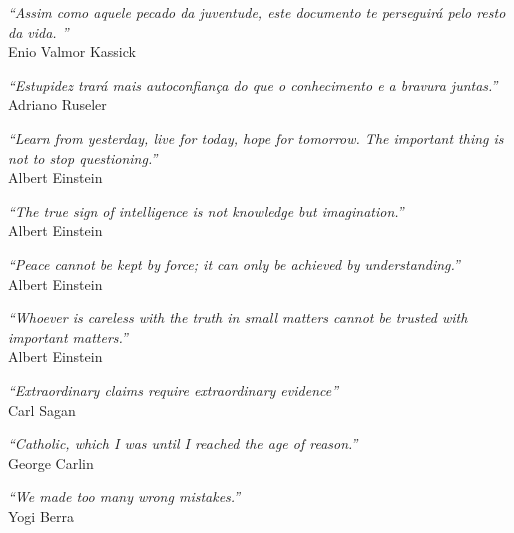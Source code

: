 


\begin{epigrafe}

    \vspace*{\fill}
    \begin{flushright}
        \textit{``Assim como aquele pecado da juventude, este documento te perseguirá pelo resto da vida. \showfont''}\\Enio Valmor Kassick
    \end{flushright}
    \begin{flushright}
        \textit{``Estupidez trará mais autoconfiança do que o conhecimento e a bravura juntas.''}\\
        Adriano Ruseler
    \end{flushright}
    \begin{flushright}
        \textit{``Learn from yesterday, live for today, hope for tomorrow. The important thing is not to stop questioning.''}\\ Albert Einstein
    \end{flushright}
    \begin{flushright}
        \textit{``The true sign of intelligence is not knowledge but imagination.''}\\  Albert Einstein
    \end{flushright}
    \begin{flushright}
        \textit{``Peace cannot be kept by force; it can only be achieved by understanding.''}\\ Albert Einstein
    \end{flushright}
    \begin{flushright}
        \textit{``Whoever is careless with the truth in small matters cannot be trusted with important matters.''}\\    Albert Einstein
    \end{flushright}
    \begin{flushright}
        \textit{``Extraordinary claims require extraordinary evidence''}\\
        Carl Sagan
    \end{flushright}
    \begin{flushright}
        \textit{``Catholic, which I was until I reached the age of reason.''}\\
        George Carlin
    \end{flushright}
    \begin{flushright}
        \textit{``We made too many wrong mistakes.''}\\
        Yogi Berra
    \end{flushright}

\end{epigrafe}


